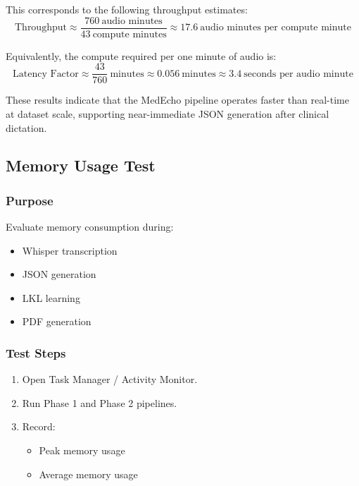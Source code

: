 This corresponds to the following throughput estimates:
\[
\text{Throughput} \approx \frac{760\ \text{audio minutes}}{43\ \text{compute minutes}}
\approx 17.6\ \text{audio minutes per compute minute}
\]

Equivalently, the compute required per one minute of audio is:
\[
\text{Latency Factor} \approx \frac{43}{760}\ \text{minutes} \approx 0.056\ \text{minutes}
\approx 3.4\ \text{seconds per audio minute}
\]

These results indicate that the MedEcho pipeline operates faster than real-time at dataset scale,
supporting near-immediate JSON generation after clinical dictation.



\subsection{Memory Usage Test}
\label{sec:testing:memory}

\subsubsection*{Purpose}
Evaluate memory consumption during:
\begin{itemize}
    \item Whisper transcription
    \item JSON generation
    \item LKL learning
    \item PDF generation
\end{itemize}

\subsubsection*{Test Steps}
\begin{enumerate}
    \item Open Task Manager / Activity Monitor.
    \item Run Phase 1 and Phase 2 pipelines.
    \item Record:
    \begin{itemize}
        \item Peak memory usage
        \item Average memory usage
    \end{itemize}
\end{enumerate}

